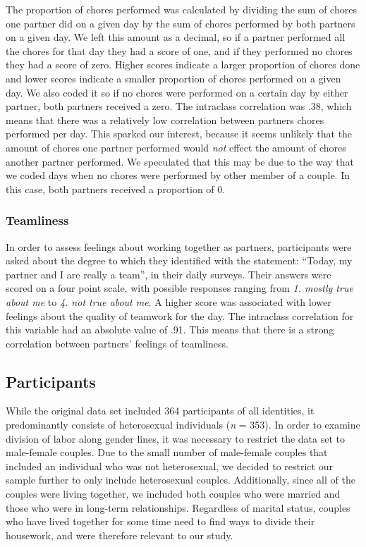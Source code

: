 \documentclass[
  english,
  man]{apa6}
\begin{document}
The proportion of chores performed was calculated by dividing the sum of chores one partner did on a given day by the sum of chores performed by both partners on a given day. We left this amount as a decimal, so if a partner performed all the chores for that day they had a score of one, and if they performed no chores they had a score of zero. Higher scores indicate a larger proportion of chores done and lower scores indicate a smaller proportion of chores performed on a given day. We also coded it so if no chores were performed on a certain day by either partner, both partners received a zero. The intraclass correlation was .38, which means that there was a relatively low correlation between partners chores performed per day. This sparked our interest, because it seems unlikely that the amount of chores one partner performed would \emph{not} effect the amount of chores another partner performed. We speculated that this may be due to the way that we coded days when no chores were performed by other member of a couple. In this case, both partners received a proportion of 0.

\hypertarget{teamliness}{%
\subsubsection{Teamliness}\label{teamliness}}

In order to assess feelings about working together as partners, participants were asked about the degree to which they identified with the statement: \enquote{Today, my partner and I are really a team}, in their daily surveys. Their answers were scored on a four point scale, with possible responses ranging from \emph{1. mostly true about me} to \emph{4. not true about me}. A higher score was associated with lower feelings about the quality of teamwork for the day. The intraclass correlation for this variable had an absolute value of .91. This means that there is a strong correlation between partners' feelings of teamliness.

\hypertarget{participants}{%
\subsection{Participants}\label{participants}}

While the original data set included 364 participants of all identities, it predominantly consists of heterosexual individuals (\emph{n} = 353). In order to examine division of labor along gender lines, it was necessary to restrict the data set to male-female couples. Due to the small number of male-female couples that included an individual who was not heterosexual, we decided to restrict our sample further to only include heterosexual couples. Additionally, since all of the couples were living together, we included both couples who were married and those who were in long-term relationships. Regardless of marital status, couples who have lived together for some time need to find ways to divide their housework, and were therefore relevant to our study.
\end{document}
